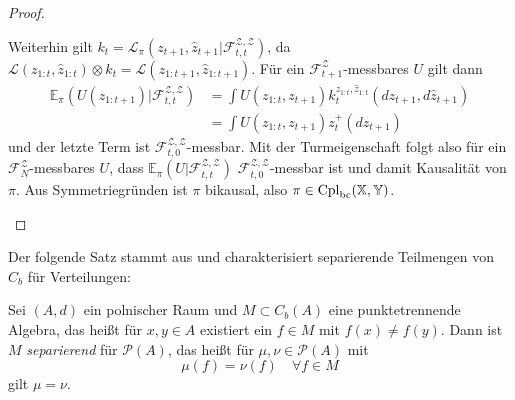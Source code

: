 \begin{proof}
\begin{enumerate}
Weiterhin gilt $k_t = \mathcal{L}_\pi(z_{t+1}, \hat{z}_{t+1} \vert \mathcal{F}_{t,t}^{\mathcal{Z,Z}})$, da $\mathcal{L}(z_{1:t}, \hat{z}_{1:t}) \otimes k_t = \mathcal{L}(z_{1:t+1}, \hat{z}_{1:t+1})$. Für ein $\mathcal{F}_{t+1}^\mathcal{Z}$-messbares $U$ gilt dann
\begin{align*}
    \mathbb{E}_\pi(U(z_{1:t+1}) \vert \mathcal{F}_{t,t}^{\mathcal{Z,Z}}) &= \int U(z_{1:t}, z_{t+1}) k_t^{z_{1:t}, \hat{z}_{1:t}}(dz_{t+1}, d\hat{z}_{t+1}) \\
    &= \int U(z_{1:t}, z_{t+1}) z_t^+(dz_{t+1})
\end{align*}
und der letzte Term ist $\mathcal{F}_{t,0}^{\mathcal{Z,Z}}$-messbar. Mit der Turmeigenschaft folgt also für ein $\mathcal{F}_N^\mathcal{Z}$-messbares $U$, dass $\mathbb{E}_\pi\left(U \vert \mathcal{F}_{t,t}^{\mathcal{Z,Z}}\right)$ $\mathcal{F}_{t,0}^{\mathcal{Z,Z}}$-messbar ist und damit Kausalität von $\pi$. Aus Symmetriegründen ist $\pi$ bikausal, also $\pi \in \operatorname{Cpl}_{\operatorname{bc}}(\mathbb{X}, \mathbb{Y})$.
\end{enumerate}
\end{proof}
Der folgende Satz stammt aus \cite[Satz 4.5]{markov_processes_ethier} und charakterisiert separierende Teilmengen von $C_b$ für Verteilungen:
\begin{theorem} \label{thm:separating_measures}
    Sei $(A, d)$ ein polnischer Raum und $M \subset C_b(A)$ eine punktetrennende Algebra, das heißt für $x,y\in A$ existiert ein $f\in M$ mit $f(x)\neq f(y)$. Dann ist $M$ \emph{separierend} für $\mathcal{P}(A)$, das heißt für $\mu, \nu \in \mathcal{P}(A)$ mit
    \begin{equation}\label{eq:A20}
        \mu(f)=\nu(f) \quad \forall f \in M 
    \end{equation}
    gilt $\mu=\nu$.
\end{theorem}

